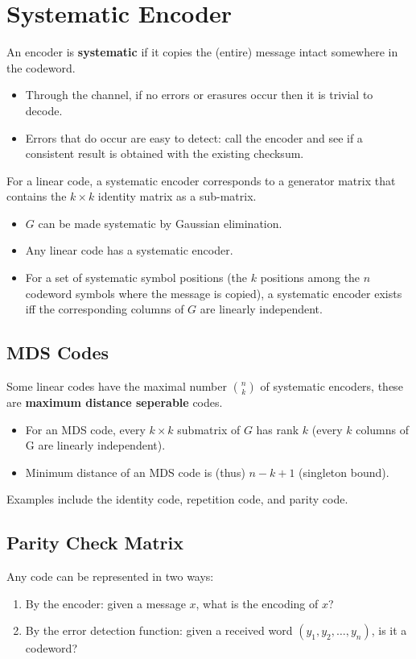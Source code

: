 \documentclass[11pt]{article}
\begin{document}
\section{Systematic Encoder}
An encoder is \textbf{systematic} if it copies the (entire) message intact somewhere in the codeword.
\begin{itemize}
  \item Through the channel, if no errors or erasures occur then it is trivial to decode.
  \item Errors that do occur are easy to detect: call the encoder and see if a consistent result is obtained with the existing checksum.
\end{itemize}

For a linear code, a systematic encoder corresponds to a generator matrix that contains the $k \times k$ identity matrix as a sub-matrix.
\begin{itemize}
  \item $G$ can be made systematic by Gaussian elimination.
  \item Any linear code has a systematic encoder.
  \item For a set of systematic symbol positions (the $k$ positions among the $n$ codeword symbols where the message is copied), a systematic encoder exists iff the corresponding columns of $G$ are linearly independent.
\end{itemize}

\subsection{MDS Codes}
Some linear codes have the maximal number $\binom{n}{k}$ of systematic encoders, these are \textbf{maximum distance seperable} codes.
\begin{itemize}
  \item For an MDS code, every $k \times k$ submatrix of $G$ has rank $k$ (every $k$ columns of G are linearly independent).
  \item Minimum distance of an MDS code is (thus) $n - k + 1$ (singleton bound).
\end{itemize}

Examples include the identity code, repetition code, and parity code.

\subsection{Parity Check Matrix}
Any code can be represented in two ways:
\begin{enumerate}
  \item By the encoder: given a message $x$, what is the encoding of $x$?
  \item By the error detection function: given a received word $(y_1, y_2, \ldots, y_n)$, is it a codeword?
\end{enumerate}
\end{document}
